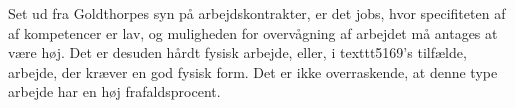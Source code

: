 Set ud fra Goldthorpes syn på arbejdskontrakter, er det jobs, hvor specifiteten af af kompetencer er lav, og muligheden for overvågning af arbejdet må antages at være høj. Det er desuden hårdt fysisk arbejde, eller, i  texttt{5169}'s tilfælde, arbejde, der kræver en god fysisk form. Det er ikke overraskende, at denne type arbejde har en høj frafaldsprocent. %






























%







